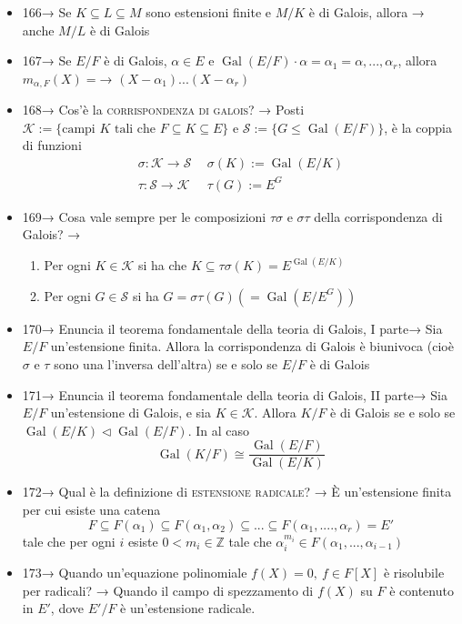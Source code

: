 \documentclass[A4,12pt]{article}
\newcommand{\Z}{\mathbb{Z}}
\renewcommand{\subset}{\subseteq}
\begin{document}
\begin{itemize}[noitemsep]
\begin{enumerate}
		\end{enumerate}
		\item 166→ Se $ K\subset L\subset M $ sono estensioni finite e $ M/K $ è di Galois, allora → anche $ M/L $ è di Galois
		\item 167→ Se $ E/F $ è di Galois, $ \alpha \in E $ e $ \operatorname{Gal}(E/F)\cdot \alpha = {\alpha_1 = \alpha,...,\alpha_r} $, allora $ m_{\alpha, F}(X)= $→ $ (X-\alpha_1)...(X-\alpha_r) $
		\item 168→ Cos'è la \textsc{corrispondenza di galois}? → Posti $ \mathscr{K}:=\{\text{campi }K\text{ tali che } F\subset K\subset E\} $ e $ \mathscr{S}:= \{G\leq \operatorname{Gal}(E/F)\} $, è la coppia di funzioni \begin{align*}
			\sigma:\mathscr{K}\to \mathscr{S}\ \ & \sigma(K) := \operatorname{Gal}(E/K)\\
			\tau:\mathscr{S}\to \mathscr{K}\ \ & \tau(G):=E^G
		\end{align*}
		\item 169→ Cosa vale sempre per le composizioni $ \tau\sigma $ e $ \sigma\tau $ della corrispondenza di Galois? → \begin{enumerate}
			\item Per ogni $ K\in \mathscr{K} $ si ha che $ K\subset \tau\sigma(K)=E^{\operatorname{Gal}(E/K)}$
			\item Per ogni $ G\in \mathscr{S} $ si ha $ G=\sigma\tau(G)(=\operatorname{Gal}(E/E^G)) $
		\end{enumerate}
		\item 170→ Enuncia il teorema fondamentale della teoria di Galois, I parte→ Sia $ E/F $ un'estensione finita. Allora la corrispondenza di Galois è biunivoca (cioè $ \sigma $ e $ \tau $ sono una l'inversa dell'altra) se e solo se $ E/F $ è di Galois
		\item 171→ Enuncia il teorema fondamentale della teoria di Galois, II parte→ Sia $ E/F $ un'estensione di Galois, e sia $ K\in \mathscr{K} $. Allora $ K/F $ è di Galois se e solo se $ \operatorname{Gal}(E/K)\lhd \operatorname{Gal}(E/F) $. In al caso \[\operatorname{Gal}(K/F)\cong \frac{\operatorname{Gal}(E/F)}{\operatorname{Gal}(E/K)}\]
		\item 172→ Qual è la definizione di \textsc{estensione radicale}? → È un'estensione finita per cui esiste una catena \[F\subset F(\alpha_1)\subset F(\alpha_1,\alpha_2)\subset...\subset F(\alpha_1,....,\alpha_r)=E'\]
		tale che per ogni $ i $ esiste $ 0<m_i\in \Z $ tale che $ \alpha_i^{m_i}\in F(\alpha_1,...,\alpha_{i-1}) $
		\item 173→ Quando un'equazione polinomiale $ f(X)=0,\ f\in F[X] $ è risolubile per radicali? → Quando il campo di spezzamento di $ f(X) $ su $ F $ è contenuto in $ E' $, dove $ E'/F $ è un'estensione radicale.

\end{itemize}
\end{document}
